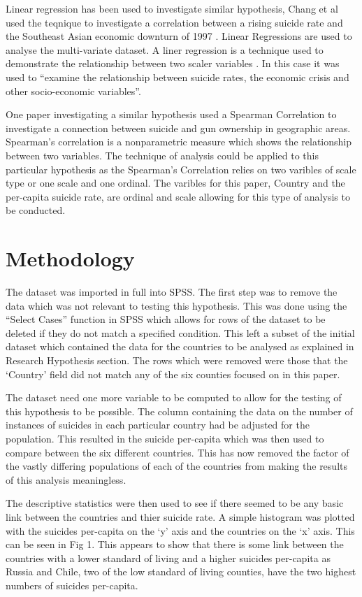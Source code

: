 \documentclass[conference]{IEEEtran}
\begin{document}
Linear regression has been used to investigate similar hypothesis, Chang et al used the teqnique to investigate a 
correlation between a rising suicide rate and the Southeast Asian economic downturn of 1997 \cite{SEAsia_sui}.
Linear Regressions are used to analyse the multi-variate dataset. A liner regression is a technique used to demonstrate the relationship between two scaler variables \cite{stats_models_book}. 
In this case it was used to ``examine the relationship between suicide rates, the economic crisis and other socio-economic variables''\cite{SEAsia_sui}.

One paper investigating a similar hypothesis used a Spearman Correlation to investigate a connection between suicide and gun ownership in geographic areas.
Spearman's correlation is a nonparametric measure which shows the relationship between two variables\cite{gun_sui}.
The technique of analysis could be applied to this particular hypothesis as the Spearman's Correlation relies on two varibles of scale type or one scale and one ordinal.
The varibles for this paper, Country and the per-capita suicide rate, are ordinal and scale allowing for this type of analysis to be conducted.

\section{Methodology}
The dataset was imported in full into SPSS. The first step was to remove the data which was not relevant to testing this hypothesis.
This was done using the ``Select Cases'' function in SPSS which allows for rows of the dataset to be deleted if they do not match a specified condition.
This left a subset of the initial dataset which contained the data for the countries to be analysed as explained in Research Hypothesis section.
The rows which were removed were those that the `Country' field did not match any of the six counties focused on in this paper.

The dataset need one more variable to be computed to allow for the testing of this hypothesis to be possible.
The column containing the data on the number of instances of suicides in each particular country had be adjusted for the population.
This resulted in the suicide per-capita which was then used to compare between the six different countries.
This has now removed the factor of the vastly differing populations of each of the countries from making the results of this analysis meaningless.

The descriptive statistics were then used to see if there seemed to be any basic link between the countries and thier suicide rate.
A simple histogram was plotted with the suicides per-capita on the `y' axis and the countries on the `x' axis.
This can be seen in Fig 1.
This appears to show that there is some link between the countries with a lower standard of living and a higher suicides per-capita as
Russia and Chile, two of the low standard of living counties, have the two highest numbers of suicides per-capita.
\end{document}
